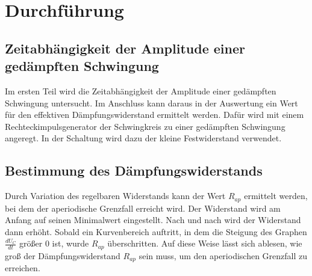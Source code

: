 \section{Durchführung}
\label{sec:Durchfuehrung}

\subsection{Zeitabhängigkeit der Amplitude einer gedämpften Schwingung}
Im ersten Teil wird die Zeitabhängigkeit der Amplitude einer gedämpften Schwingung untersucht. Im Anschluss kann 
daraus in der Auswertung ein Wert für den effektiven Dämpfungswiderstand ermittelt werden. 
Dafür wird mit einem Rechteckimpulsgenerator der Schwingkreis zu einer gedämpften Schwingung angeregt. %
In der Schaltung wird dazu der kleine Festwiderstand verwendet.

\subsection{Bestimmung des Dämpfungswiderstands}
Durch Variation des regelbaren Widerstands kann der Wert $R_{ap}$ ermittelt werden, bei dem der aperiodische
Grenzfall erreicht wird.
Der Widerstand wird am Anfang auf seinen Minimalwert eingestellt. Nach und nach wird der Widerstand dann erhöht. %
Sobald ein Kurvenbereich auftritt, in dem die Steigung des Graphen $\frac{dU_{C}}{dt}$ größer 0 ist, wurde 
$R_{ap}$ überschritten. Auf diese Weise lässt sich ablesen, wie groß der Dämpfungswiderstand $R_{ap}$
sein muss, um den aperiodischen Grenzfall zu erreichen.

